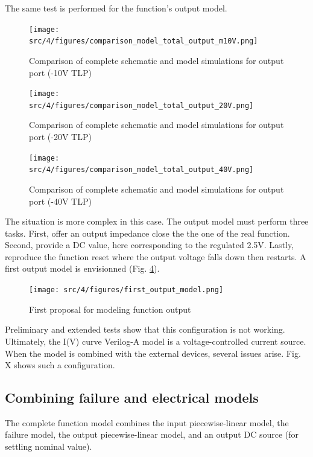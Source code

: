 The same test is performed for the function's output model.

\begin{figure}[!h]
  \centering
  \texttt{[image: src/4/figures/comparison\_model\_total\_output\_m10V.png]}
  \caption{Comparison of complete schematic and model simulations for output port (-10V TLP)}
  \label{fig:compare-model-simu-m10}
\end{figure}

\begin{figure}[!h]
  \centering
  \texttt{[image: src/4/figures/comparison\_model\_total\_output\_20V.png]}
  \caption{Comparison of complete schematic and model simulations for output port (-20V TLP)}
  \label{fig:compare-model-simu-20}
\end{figure}

\begin{figure}[!h]
  \centering
  \texttt{[image: src/4/figures/comparison\_model\_total\_output\_40V.png]}
  \caption{Comparison of complete schematic and model simulations for output port (-40V TLP)}
  \label{fig:compare-model-simu-40}
\end{figure}

The situation is more complex in this case.
The output model must perform three tasks.
First, offer an output impedance close the the one of the real function.
Second, provide a DC value, here corresponding to the regulated 2.5V.
Lastly, reproduce the function reset where the output voltage falls down then restarts.
A first output model is envisionned (Fig. \ref{fig:first-output-model}).

\begin{figure}[!h]
  \centering
  \texttt{[image: src/4/figures/first\_output\_model.png]}
  \caption{First proposal for modeling function output}
  \label{fig:first-output-model}
\end{figure}

Preliminary and extended tests show that this configuration is not working.
Ultimately, the I(V) curve Verilog-A model is a voltage-controlled current source.
When the model is combined with the external devices, several issues arise.
Fig. X shows such a configuration.

\subsection{Combining failure and electrical models}

The complete function model combines the input piecewise-linear model, the failure model, the output piecewise-linear model, and an output DC source (for settling nominal value).

